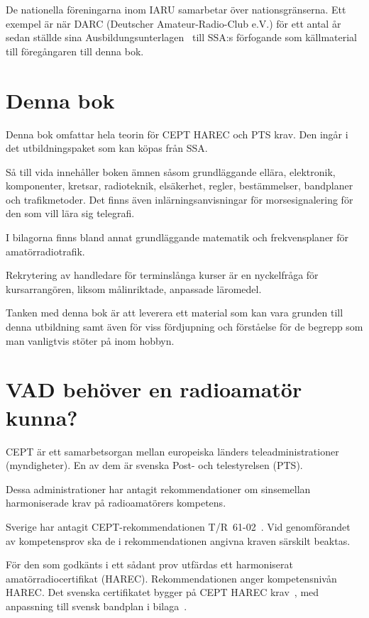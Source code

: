 De nationella föreningarna inom IARU samarbetar över nationsgränserna.
Ett exempel är när DARC (Deutscher Amateur-Radio-Club e.V.) för ett antal år
sedan ställde sina Ausbildungsunterlagen~\cite{DARCaus} till SSA:s förfogande
som källmaterial till föregångaren till denna bok.

\section*{Denna bok}

Denna bok omfattar hela teorin för CEPT HAREC och PTS krav.
Den ingår i det utbildningspaket som kan köpas från SSA.

Så till vida innehåller boken ämnen såsom grundläggande ellära, elektronik,
komponenter, kretsar, radioteknik, elsäkerhet, regler, bestämmelser, bandplaner
och trafikmetoder.
Det finns även inlärningsanvisningar för morsesignalering för den som vill lära
sig telegrafi.

I bilagorna finns bland annat grundläggande matematik och frekvensplaner för
amatörradiotrafik.

Rekrytering av handledare för terminslånga kurser är en nyckelfråga för
kursarrangören, liksom målinriktade, anpassade läromedel.

Tanken med denna bok är att leverera ett material som kan vara grunden till
denna utbildning samt även för viss fördjupning och förståelse för de begrepp
som man vanligtvis stöter på inom hobbyn.

\section*{VAD behöver en radioamatör kunna?}
\balance

CEPT är ett samarbetsorgan mellan europeiska länders teleadministrationer
(myndigheter).
En av dem är svenska Post- och telestyrelsen (PTS).

Dessa administrationer har antagit rekommendationer om sinsemellan
harmoniserade krav på radioamatörers kompetens.

Sverige har antagit CEPT-rekommendationen T/R~61-02~\cite{TR6102}.
Vid genomförandet av kompetensprov ska de i rekommendationen angivna kraven
särskilt beaktas.

För den som godkänts i ett sådant prov utfärdas ett harmoniserat
amatörradiocertifikat (HAREC).
Rekommendationen anger kompetensnivån HAREC.
%
Det svenska certifikatet bygger på CEPT HAREC krav~\cite{TR6102},
med anpassning till svensk bandplan i bilaga~.

